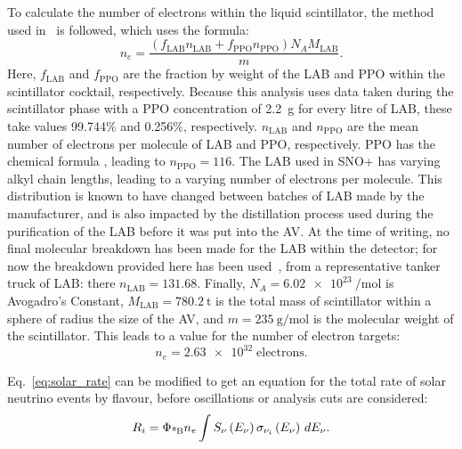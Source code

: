 To calculate the number of electrons within the liquid scintillator, the method used in~\cite{inacioDataAnalysisWater2022} is followed, %
which uses the formula:
\begin{equation}
    n_{e} = \frac{\left(f_{\mathrm{LAB}}n_{\mathrm{LAB}} +
                        f_{\mathrm{PPO}}n_{\mathrm{PPO}}\right)
                  N_{A}M_{\mathrm{LAB}}}
                 {m}.
\end{equation}
Here, $f_{\mathrm{LAB}}$ and $f_{\mathrm{PPO}}$ are the fraction by weight of the LAB and PPO within the scintillator cocktail, respectively. Because this analysis uses data taken during the scintillator phase with a PPO concentration of \SI{2.2}{\g} for every litre of LAB, these take values 99.744\% and 0.256\%, respectively. $n_{\mathrm{LAB}}$ and $n_{\mathrm{PPO}}$ are the mean number of electrons per molecule of LAB and PPO, respectively. PPO has the chemical formula , leading to $n_{\mathrm{PPO}} = 116$. The LAB used in SNO+ has varying alkyl chain lengths, leading to a varying number of electrons per molecule. This distribution is known to have changed between batches of LAB made by the manufacturer, and is also impacted by the distillation process used during the purification of the LAB before it was put into the AV. At the time of writing, no final molecular breakdown has been made for the LAB within the detector; for now the breakdown provided here has been used~\cite{lebeufLABCertificateAnalysis2020}, %
from a representative tanker truck of LAB: there $n_{\mathrm{LAB}} = 131.68$. Finally, $N_{A} = \SI{6.02e23}{\per\mol}$ is Avogadro's Constant, $M_{\mathrm{LAB}} = \SI{780.2}{\tonne}$ is the total mass of scintillator within a sphere of radius the size of the AV, and $m = \SI{235}{\g\per\mol}$ is the molecular weight of the scintillator. This leads to a value for the number of electron targets:
\begin{equation*}
    n_{e} = \num{2.63e32}\; \mathrm{electrons}.
\end{equation*}

Eq.~\ref{eq:solar_rate} can be modified to get an equation for the total rate of solar neutrino events by flavour, before oscillations or analysis cuts are considered:\
\begin{equation}
    R_{i} = \Phi_{\beight{}}n_{e}
                \int S_{\nu}\left(E_{\nu}\right)\sigma_{\nu_{i}}\left(E_{\nu}\right)\,dE_{\nu}.
\end{equation}


